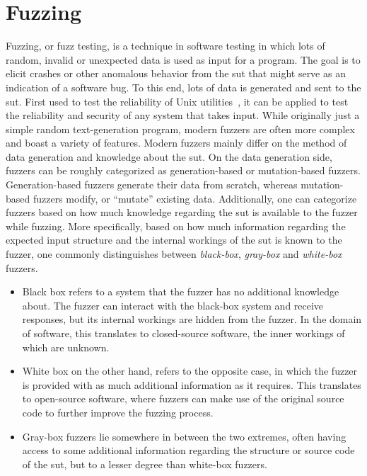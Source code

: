 \section{Fuzzing}
Fuzzing, or fuzz testing, is a technique in software testing in which lots of random, invalid or unexpected data is used as input for a program. The goal is to elicit crashes or other anomalous behavior from the \ac{sut} that might serve as an indication of a software bug. To this end, lots of data is generated and sent to the \ac{sut}. First used to test the reliability of Unix utilities~\cite{miller1990empirical}, it can be applied to test the reliability and security of any system that takes input. While originally just a simple random text-generation program, modern fuzzers are often more complex and boast a variety of features. Modern fuzzers mainly differ on the method of data generation and knowledge about the \ac{sut}. On the data generation side, fuzzers can be roughly categorized as generation-based or mutation-based fuzzers. Generation-based fuzzers generate their data from scratch, whereas mutation-based fuzzers modify, or ``mutate'' existing data. Additionally, one can categorize fuzzers based on how much knowledge regarding the \ac{sut} is available to the fuzzer while fuzzing. More specifically, based on how much information regarding the expected input structure and the internal workings of the \ac{sut} is known to the fuzzer, one commonly distinguishes between \emph{black-box}, \emph{gray-box} and \emph{white-box} fuzzers. 

\begin{itemize}
	\item Black box refers to a system that the fuzzer has no additional knowledge about. The fuzzer can interact with the black-box system and receive responses, but its internal workings are hidden from the fuzzer. In the domain of software, this translates to closed-source software, the inner workings of which are unknown.
	\item White box on the other hand, refers to the opposite case, in which the fuzzer is provided with as much additional information as it requires. This translates to open-source software, where fuzzers can make use of the original source code to further improve the fuzzing process. 
	\item Gray-box fuzzers lie somewhere in between the two extremes, often having access to some additional information regarding the structure or source code of the \ac{sut}, but to a lesser degree than white-box fuzzers.
\end{itemize}

